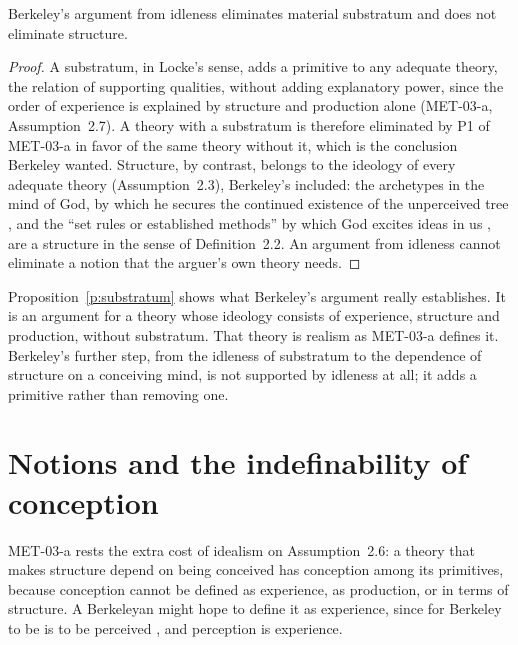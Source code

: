 \documentclass{situationist-preprint}
\begin{document}
\begin{proposition}\label{p:substratum}
Berkeley's argument from idleness eliminates material substratum and does not eliminate structure.
\end{proposition}

\begin{proof}
A substratum, in Locke's sense, adds a primitive to any adequate theory, the relation of supporting qualities, without adding explanatory power, since the order of experience is explained by structure and production alone (MET-03-a, Assumption~2.7). A theory with a substratum is therefore eliminated by P1 of MET-03-a in favor of the same theory without it, which is the conclusion Berkeley wanted. Structure, by contrast, belongs to the ideology of every adequate theory (Assumption~2.3), Berkeley's included: the archetypes in the mind of God, by which he secures the continued existence of the unperceived tree \citep[third dialogue]{BerkeleyDialogues}, and the \enquote{set rules or established methods} by which God excites ideas in us \citep[\S 30]{BerkeleyPrinciples}, are a structure in the sense of Definition~2.2. An argument from idleness cannot eliminate a notion that the arguer's own theory needs.
\end{proof}

Proposition~\ref{p:substratum} shows what Berkeley's argument really establishes. It is an argument for a theory whose ideology consists of experience, structure and production, without substratum. That theory is realism as MET-03-a defines it. Berkeley's further step, from the idleness of substratum to the dependence of structure on a conceiving mind, is not supported by idleness at all; it adds a primitive rather than removing one.

\section{Notions and the indefinability of conception}

MET-03-a rests the extra cost of idealism on Assumption~2.6: a theory that makes structure depend on being conceived has conception among its primitives, because conception cannot be defined as experience, as production, or in terms of structure. A Berkeleyan might hope to define it as experience, since for Berkeley to be is to be perceived \citep[\S 3]{BerkeleyPrinciples}, and perception is experience.
\end{document}
